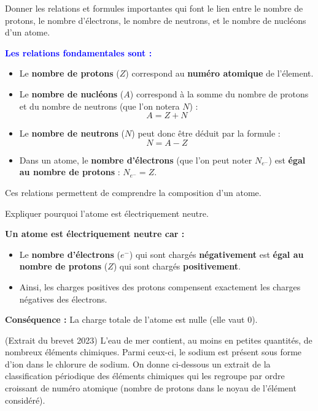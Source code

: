 \documentclass[answers]{exam}
\begin{document}
\begin{questions}
  \question[2] Donner les relations et formules importantes qui font le lien entre le nombre de protons, le nombre d'électrons, le nombre de neutrons, et le nombre de nucléons d'un atome.
  \begin{solution}
    \textcolor{blue}{\textbf{Les relations fondamentales sont :}}
    \begin{itemize}[noitemsep]
      \item Le \textbf{nombre de protons} ($Z$) correspond au \textbf{numéro atomique} de l'\'element.
      \item Le \textbf{nombre de nucl\'eons} ($A$) correspond à la somme du nombre de protons et du nombre de neutrons (que l'on notera $N$) :
      \[
      A = Z + N
      \]
      \item Le \textbf{nombre de neutrons} ($N$) peut donc être déduit par la formule :
      \[
      N = A - Z
      \]
      \item Dans un atome, le \textbf{nombre d'électrons} (que l'on peut noter $N_{e^-}$) est \textbf{égal au nombre de protons} : $N_{e^-} = Z$.
    \end{itemize}

    Ces relations permettent de comprendre la composition d'un atome.
  \end{solution}

  \question[1]  Expliquer pourquoi l'atome est électriquement neutre.

  \begin{solution}
    \textbf{Un atome est \textbf{\'electriquement neutre} car :}
    \begin{itemize}[noitemsep]
      \item Le \textbf{nombre d'électrons} ($e^-$) qui sont chargés \textbf{négativement} est \textbf{égal au nombre de protons} ($Z$) qui sont chargés \textbf{positivement}.
      \item Ainsi, les charges positives des protons compensent exactement les charges négatives des électrons.
    \end{itemize}
    \textbf{Conséquence :} La charge totale de l'atome est nulle (elle vaut $0$).
  \end{solution}

  \question[2] (Extrait du brevet 2023) L'eau de mer contient, au moins en petites quantités, de nombreux éléments chimiques. Parmi ceux-ci, le sodium est présent sous forme d’ion dans le chlorure de sodium. On
donne ci-dessous un extrait de la classification périodique des éléments chimiques qui les
regroupe par ordre croissant de numéro atomique (nombre de protons dans le noyau de
l’élément considéré).


\end{questions}
\end{document}
